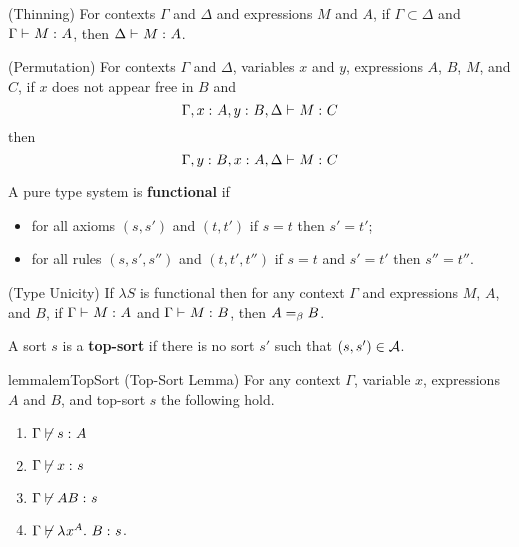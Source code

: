 \documentclass{article}
\begin{document}
\begin{lemma}
\label{lem:thinning}
(Thinning)
For contexts $\Gamma$ and $\Delta$ and expressions $M$ and $A$, if  $\Gamma \subset \Delta$ and $\Gamma \vdash_{} {{M} :^{} {A}}$, then $\Delta \vdash_{} {{M} :^{} {A}}$.
\end{lemma}

\begin{lemma}
\label{lem:permutation}
(Permutation) For contexts $\Gamma$ and $\Delta$, variables $x$ and $y$, expressions $A$, $B$, $M$, and $C$, if $x$ does not appear free in $B$ and
\[
    \judgment{
        \Gamma, \statement x A, \statement y B, \Delta
    }{M}{C}
\]
then
\[
    \judgment{
        \Gamma, \statement y B, \statement x A, \Delta
    }{M}{C}
\]
\end{lemma}

\begin{definition}
\label{def:functional}
A pure type system is \textbf{functional} if
\begin{itemize}
    \item for all axioms $(s, s')$ and $(t, t')$ if $s = t$ then $s' = t'$;
    \item for all rules $(s, s', s'')$ and $(t, t', t'')$ if $s = t$ and $s' = t'$ then $s''  = t''$.
\end{itemize}
\end{definition}

\begin{lemma}
\label{lem:unicity}
(Type Unicity)
If $\lambda S$ is functional then for any context $\Gamma$ and expressions $M$, $A$, and $B$, if $\Gamma \vdash_{} {{M} :^{} {A}}$ and $\Gamma \vdash_{} {{M} :^{} {B}}$, then $A =_\beta B$.
\end{lemma}

\begin{definition}
A sort $s$ is a \textbf{top-sort} if there is no sort $s'$ such that $(s, s') \in \mathcal A$.
\end{definition}

\begin{restatable}{lemma}{lemTopSort}
\label{lem:top-sort}
(Top-Sort Lemma)
For any context $\Gamma$, variable $x$, expressions $A$ and $B$, and top-sort $s$ the following hold.
\begin{enumerate}
    \item $\Gamma \not \vdash {{s} :^{} {A}}$
    \item $\Gamma \not \vdash {{x} :^{} {s}}$
    \item $\Gamma \not \vdash {{AB} :^{} {s}}$
    \item $\Gamma \not \vdash {{\lambda^{} x^{A}. \ B} :^{} {s}}$.
\end{enumerate}
\end{restatable}
\end{document}
